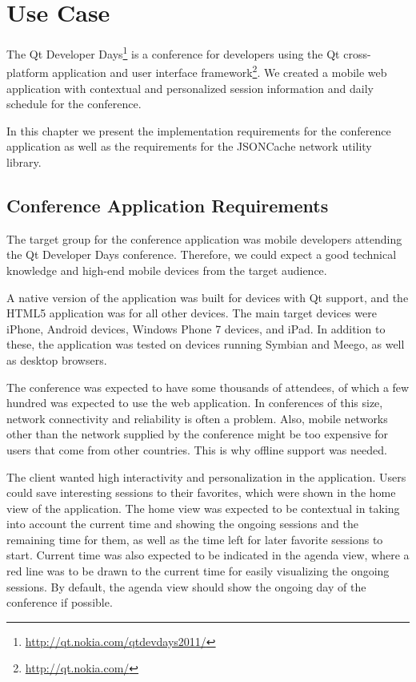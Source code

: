 \chapter{Use Case}
\label{chapter:methods}

The Qt Developer
Days\footnote{\url{http://qt.nokia.com/qtdevdays2011/}} is a
conference for developers using the Qt cross-platform application and
user interface framework\footnote{\url{http://qt.nokia.com/}}. We
created a mobile web application with contextual and personalized
session information and daily schedule for the conference.

In this chapter we present the implementation requirements for the
conference application as well as the requirements for the JSONCache
network utility library.

\section{Conference Application Requirements}

The target group for the conference application was mobile developers
attending the Qt Developer Days conference. Therefore, we could expect
a good technical knowledge and high-end mobile devices from the target
audience.

A native version of the application was built for devices with Qt
support, and the HTML5 application was for all other devices. The main
target devices were iPhone, Android devices, Windows Phone 7 devices,
and iPad. In addition to these, the application was tested on devices
running Symbian and Meego, as well as desktop browsers.

The conference was expected to have some thousands of attendees, of
which a few hundred was expected to use the web application. In
conferences of this size, network connectivity and reliability is
often a problem. Also, mobile networks other than the 
network supplied by the conference might be too expensive for users
that come from other countries. This is why offline support was
needed.

The client wanted high interactivity and personalization in the
application. Users could save interesting sessions to their favorites,
which were shown in the home view of the application. The home view
was expected to be contextual in taking into account the current time
and showing the ongoing sessions and the remaining time for them, as
well as the time left for later favorite sessions to start. Current
time was also expected to be indicated in the agenda view, where a red
line was to be drawn to the current time for easily visualizing the
ongoing sessions. By default, the agenda view should show the ongoing
day of the conference if possible.

